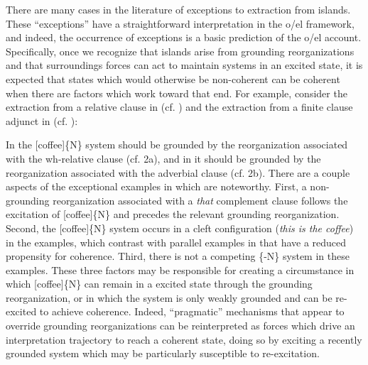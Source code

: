   There are many cases in the literature of exceptions to extraction from islands. These “exceptions” have a straightforward interpretation in the o/el framework, and indeed, the occurrence of exceptions is a basic prediction of the o/el account. Specifically, once we recognize that islands arise from grounding reorganizations and that surroundings forces can act to maintain systems in an excited state, it is expected that states which would otherwise be non-coherent can be coherent when there are factors which work toward that end. For example, consider the extraction from a relative clause in  (cf. \citep{Erteschik-ShirLappin1979}) and the extraction from a finite clause adjunct in  (cf. \citep{Truswell2011}):

\ea  
\z
\z

\ea
{}
\z
\z

\ea
\z
\z

In  the [coffee]\{N\} system should be grounded by the reorganization associated with the wh-relative clause (cf. 2a), and in  it should be grounded by the reorganization associated with the adverbial clause (cf. 2b). There are a couple aspects of the exceptional examples in  which are noteworthy. First, a non-grounding reorganization associated with a \textit{that} complement clause follows the excitation of [coffee]\{N\} and precedes the relevant grounding reorganization. Second, the [coffee]\{N\} system occurs in a cleft configuration (\textit{this is the coffee}) in the  examples, which contrast with parallel examples in  that have a reduced propensity for coherence. Third, there is not a competing \{-N\} system in these examples. These three factors may be responsible for creating a circumstance in which [coffee]\{N\} can remain in a excited state through the grounding reorganization, or in which the system is only weakly grounded and can be re-excited to achieve coherence. Indeed, “pragmatic” mechanisms that appear to override grounding reorganizations can be reinterpreted as forces which drive an interpretation trajectory to reach a coherent state, doing so by exciting a recently grounded system which may be particularly susceptible to re-excitation.

